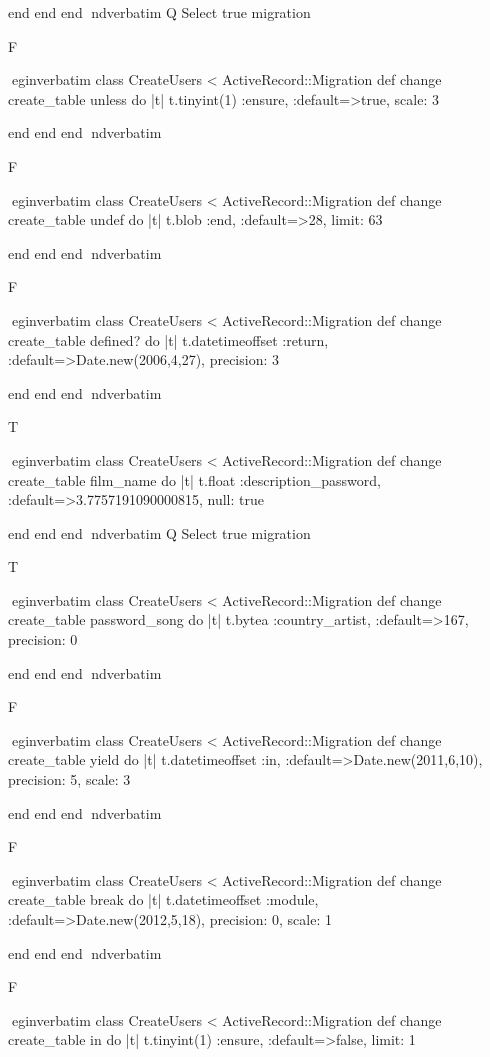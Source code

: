     end 
  end 
end
nd{verbatim}
Q
 Select true migration

F

egin{verbatim}
 class CreateUsers < ActiveRecord::Migration 
  def change 
    create_table unless do |t| 
      t.tinyint(1) :ensure, :default=>true, scale: 3
    
    end 
  end 
end
nd{verbatim}

F

egin{verbatim}
 class CreateUsers < ActiveRecord::Migration 
  def change 
    create_table undef do |t| 
      t.blob :end, :default=>28, limit: 63
    
    end 
  end 
end
nd{verbatim}

F

egin{verbatim}
 class CreateUsers < ActiveRecord::Migration 
  def change 
    create_table defined? do |t| 
      t.datetimeoffset :return, :default=>Date.new(2006,4,27), precision: 3
    
    end 
  end 
end
nd{verbatim}

T

egin{verbatim}
 class CreateUsers < ActiveRecord::Migration 
  def change 
    create_table film_name do |t| 
      t.float :description_password, :default=>3.7757191090000815, null: true
    
    end 
  end 
end
nd{verbatim}
Q
 Select true migration

T

egin{verbatim}
 class CreateUsers < ActiveRecord::Migration 
  def change 
    create_table password_song do |t| 
      t.bytea :country_artist, :default=>167, precision: 0
    
    end 
  end 
end
nd{verbatim}

F

egin{verbatim}
 class CreateUsers < ActiveRecord::Migration 
  def change 
    create_table yield do |t| 
      t.datetimeoffset :in, :default=>Date.new(2011,6,10), precision: 5, scale: 3
    
    end 
  end 
end
nd{verbatim}

F

egin{verbatim}
 class CreateUsers < ActiveRecord::Migration 
  def change 
    create_table break do |t| 
      t.datetimeoffset :module, :default=>Date.new(2012,5,18), precision: 0, scale: 1
    
    end 
  end 
end
nd{verbatim}

F

egin{verbatim}
 class CreateUsers < ActiveRecord::Migration 
  def change 
    create_table in do |t| 
      t.tinyint(1) :ensure, :default=>false, limit: 1
    
